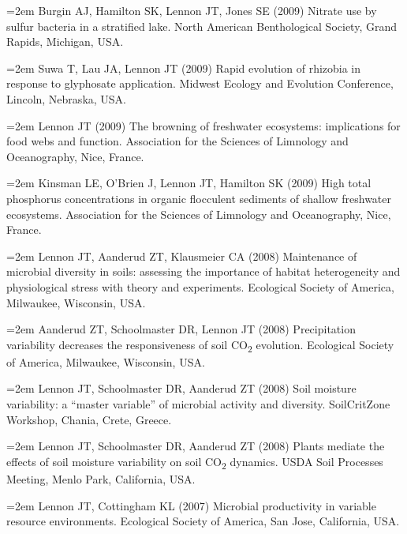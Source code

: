 \documentclass[11pt]{article}
\begin{document}
{\hangindent=2em Burgin AJ, Hamilton SK, Lennon JT, Jones SE (2009) Nitrate use by sulfur bacteria in a stratified lake. North American Benthological Society, Grand Rapids, Michigan, USA. \par

\hangindent=2em Suwa T, Lau JA, Lennon JT (2009) Rapid evolution of rhizobia in response to glyphosate application. Midwest Ecology and Evolution Conference, Lincoln, Nebraska, USA. \par

\hangindent=2em Lennon JT (2009) The browning of freshwater ecosystems: implications for food webs and function. Association for the Sciences of Limnology and Oceanography, Nice, France. \par

\hangindent=2em Kinsman LE, O’Brien J, Lennon JT, Hamilton SK (2009) High total phosphorus concentrations in organic flocculent sediments of shallow freshwater ecosystems. Association for the Sciences of Limnology and Oceanography, Nice, France. \par

\hangindent=2em Lennon JT, Aanderud ZT, Klausmeier CA (2008) Maintenance of microbial diversity in soils: assessing the importance of habitat heterogeneity and physiological stress with theory and experiments. Ecological Society of America, Milwaukee, Wisconsin, USA. \par

\hangindent=2em Aanderud ZT, Schoolmaster DR, Lennon JT (2008) Precipitation variability decreases the responsiveness of soil CO\textsubscript{2} evolution. Ecological Society of America, Milwaukee, Wisconsin, USA. \par

\hangindent=2em Lennon JT, Schoolmaster DR, Aanderud ZT (2008) Soil moisture variability: a “master variable” of microbial activity and diversity. SoilCritZone Workshop, Chania, Crete, Greece. \par

\hangindent=2em Lennon JT, Schoolmaster DR, Aanderud ZT (2008) Plants mediate the effects of soil moisture variability on soil CO\textsubscript{2} dynamics. USDA Soil Processes Meeting, Menlo Park, California, USA. \par

\hangindent=2em Lennon JT, Cottingham KL (2007) Microbial productivity in variable resource environments. Ecological Society of America, San Jose, California, USA. \par

}
\end{document}
